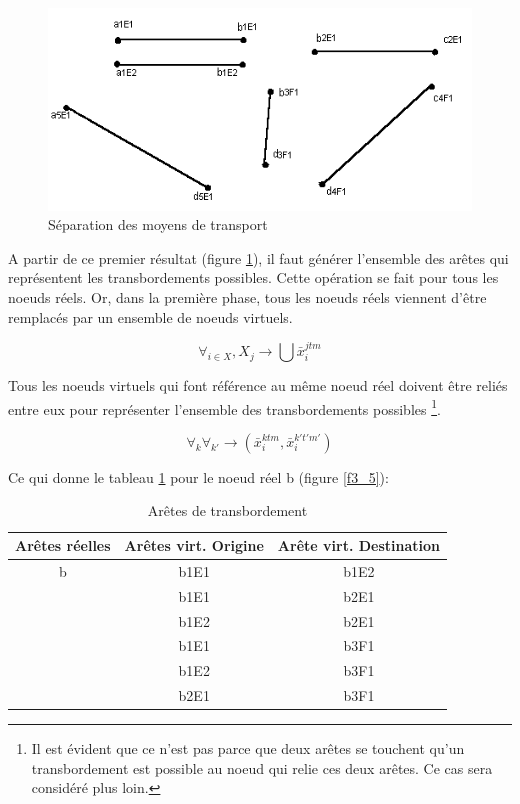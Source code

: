 \begin{figure}[htbp]
\centerline{\includegraphics[width=12cm]{f3_4.png}}
\caption{\label{f3_4} S\'eparation des moyens de transport}
\end{figure}



A partir de ce premier résultat (figure \ref{f3_4}), il faut générer l'ensemble
des arêtes qui représentent les transbordements possibles. Cette opération se
fait pour tous les noeuds réels. Or, dans la première phase, tous les noeuds
réels viennent d'être remplacés par un ensemble de noeuds virtuels.

$$\forall_{i \in X}, X_j \rightarrow \bigcup \bar x_i^{jtm} $$

Tous les noeuds virtuels qui font référence au même noeud réel
doivent être reliés entre eux pour représenter l'ensemble des
transbordements possibles
\footnote{Il est évident que ce n'est pas parce que deux arêtes se touchent
qu'un transbordement est possible au noeud qui relie ces deux
arêtes. Ce cas sera considéré plus loin.}.



$$\forall_k \forall_{k'}\rightarrow (\bar x_i^{ktm}, \bar x_i^{k't'm'})$$


Ce qui donne le tableau \ref{tab3_3} pour le noeud réel b (figure \ref{f3_5}):

\begin{table}[htbp]
\begin{center}
\begin{tabular}{ccc}
\hline
Arêtes réelles & Arêtes virt. Origine & Arête virt. Destination\\

\hline
b & b1E1 & b1E2\\

  & b1E1 & b2E1\\

  & b1E2 & b2E1\\

  & b1E1 & b3F1\\

  & b1E2 & b3F1\\

  & b2E1 & b3F1\\

\hline
\end{tabular}
\caption{\label{tab3_3} Ar\^etes de transbordement}
\end{center}
\end{table}


